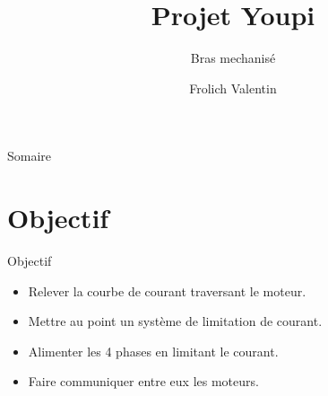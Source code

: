 \documentclass[t,12pt]{beamer}
\title{Projet Youpi}
\subtitle{\tiny{Bras mechanisé}}
\author{Frolich Valentin}
\date{\oldstylenums{Juin 2010}}
\begin{document}
\frame{\titlepage}


\begin{frame} 
	\begin{center}{\Large Somaire }\end{center}
	\tableofcontents[currentsection]       %
\end{frame} 

\section{Objectif}                                                    %
\begin{frame}                                                         %
    \begin{center}{\textcolor{grisbleu}{\Large Objectif}}\end{center} %
    \begin{itemize}                                                   %
	\item Relever la courbe de courant traversant le moteur.
	\item Mettre au point un système de limitation de courant.	
	\item Alimenter les 4 phases en limitant le courant.
	\item Faire communiquer entre eux les moteurs.
\end{itemize}
\end{frame}                                                            %
\end{document}
